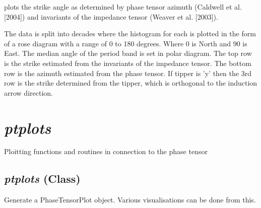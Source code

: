 plots the strike angle as determined by phase tensor azimuth (Caldwell et 
    al. [2004]) and invariants of the impedance tensor (Weaver et al. [2003]).
    
    The data is split into decades where the histogram for each is plotted in 
    the form of a rose diagram with a range of 0 to 180 degrees.
    Where 0 is North and 90 is East.   The median angle of the period band is 
    set in polar diagram.  The top row is the strike estimated from
    the invariants of the impedance tensor.  The bottom row is the azimuth
    estimated from the phase tensor.  If tipper is 'y' then the 3rd row is the
    strike determined from the tipper, which is orthogonal to the induction
    arrow direction.  


\section{\textit{ptplots}}
\label{sec:imaging.ptplots}

Ploitting functions and routines in connection to the phase tensor

\subsection{\textit{ptplots} (Class)}
\label{ssec:imaging.ptplots.ptplots}

Generate a PhaseTensorPlot object. Various visualisations can be done from this.

